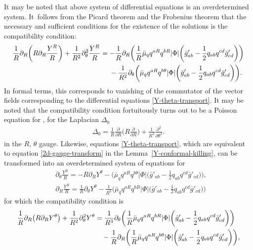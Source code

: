 \documentclass[pdftex]{sigma}
\def\ptl{\partial}%
\def\halb{\frac{1}{2}}%
\numberwithin{equation}{section}
\begin{document}
It may be noted that above system of differential equations is an overdetermined system. It~follows from the Picard theorem and the Frobenius theorem that the necessary and sufficient conditions for the existence of the solutions is the compatibility condition:
\begin{gather*}
\frac{1}{R} \ptl_R \biggl(R \ptl_R \frac{Y^R}{R} \biggr) + \frac{1}{R^2} \ptl^2 _{\theta} \frac{Y^R}{R}=
- \frac{1}{R} \ptl_R \biggl(\frac{1}{R} \bar{\mu}_q q^{aR} q^{bR} \vert \Phi \vert \biggl(\bar{g}'_{ab} - \halb q_{ab} q^{cd} \bar{g}'_{cd}\biggr)\biggr) \notag\\
\hphantom{\frac{1}{R} \ptl_R \biggl(R \ptl_R \frac{Y^R}{R} \biggr) + \frac{1}{R^2} \ptl^2 _{\theta} \frac{Y^R}{R}=}{}
-\frac{1}{R^2} \ptl_ \theta \biggl(\bar{\mu}_q q^{aR} q^{b \theta} \vert \Phi \vert \biggl(\bar{g}'_{ab} - \halb q_{ab} q^{cd} \bar{g}'_{cd}\biggr)\biggr).
\end{gather*}
In formal terms, this corresponds to vanishing of the commutator of the vector fields corresponding to the differential equations \eqref{Y-theta-transport}.
It may be noted that the compatibility condition fortuitously turns out to be a Poisson equation for , for the Laplacian $\Delta_0$
\begin{align*}
\Delta_0 = \frac{1}{R} \frac{\ptl}{ \ptl R} \biggl(R \frac{\ptl }{\ptl R} \biggr) + \frac{1}{R^2} \frac{\ptl^2}{ \ptl \theta^2}.
\end{align*}
in the $R$, $\theta$ gauge. Likewise, equations \eqref{Y-theta-transport}, which are equivalent to equation \eqref{2d-gauge-transform} in the Lemma~\ref{Y-conformal-killing}, can be transformed into an overdetermined system of equations for 
\begin{align*}
&\ptl_\theta \frac{Y^R}{R}= - R \ptl_R Y^\theta - \biggl(\bar{\mu}_q q^{aR} q^{b\theta} \vert \Phi \vert \biggl(\bar{g}'_{ab} - \halb q_{ab} q^{cd} \bar{g}'_{cd}\biggr) \biggr), \\
&\ptl_R \frac{Y^R}{R}= \frac{1}{R} \ptl_\theta Y^\theta - \frac{1}{R^2} \biggl(\bar{\mu}_q q^{aR} q^{bR} \vert \Phi \vert \biggl(\bar{g}'_{ab} - \halb q_{ab} q^{cd} \bar{g}'_{cd}\biggr) \biggr)
\end{align*}
for which the compatibility condition is
\begin{align*}
\frac{1}{R} \ptl_R \bigl(R \ptl_R Y^\theta\bigr) + \frac{1}{R^2} \ptl^2_\theta Y^\theta &{}=
\frac{1}{R^3} \ptl_\theta \biggl(\frac{1}{R} \bar{\mu}_q q^{aR} q^{bR} \vert \Phi \vert \biggl(\bar{g}'_{ab} - \halb q_{ab} q^{cd} \bar{g}'_{cd}\biggr)\biggr) \notag\\
&\quad{}- \frac{1}{R} \ptl_R \biggl(\frac{1}{R} \bar{\mu}_q q^{aR} q^{b\theta} \vert \Phi \vert \biggl(\bar{g}'_{ab} - \halb q_{ab} q^{cd} \bar{g}'_{cd}\biggr)\biggr),
 \end{align*}
\end{document}
